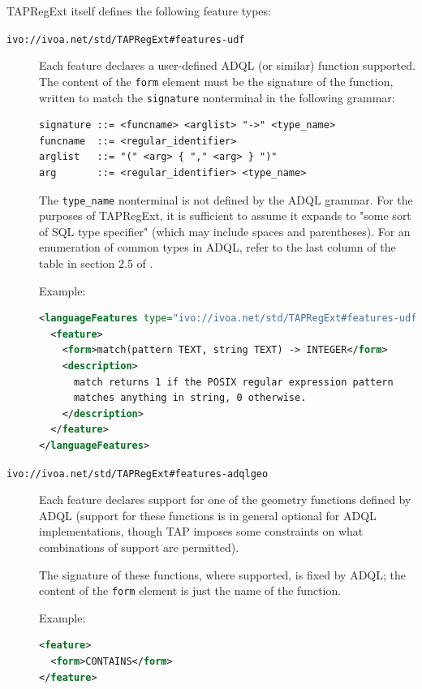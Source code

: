 \documentclass{ivoa}
\begin{document}
TAPRegExt itself defines the following feature types:


\begin{description}
\item[\nolinkurl{ivo://ivoa.net/std/TAPRegExt\#features-udf}] Each feature declares a user-defined ADQL (or similar) function supported.
    The content of the \texttt{form} element
    must be the signature of the function, written to match the
    \texttt{signature} nonterminal in the following grammar:


\begin{verbatim}
signature ::= <funcname> <arglist> "->" <type_name>
funcname  ::= <regular_identifier>
arglist   ::= "(" <arg> { "," <arg> } ")"
arg       ::= <regular_identifier> <type_name>
\end{verbatim}

The \texttt{type\_name} nonterminal is not defined by the ADQL
		grammar. For the purposes of TAPRegExt, it is sufficient to assume
		it expands to "some sort of SQL type specifier" (which may
		include spaces and parentheses).  For an enumeration of common types
		in ADQL, refer to the last column of the table in section 2.5 of 
		\citep{std:TAP}.

Example:


\begin{lstlisting}[language=XML]
<languageFeatures type="ivo://ivoa.net/std/TAPRegExt#features-udf">
  <feature>
    <form>match(pattern TEXT, string TEXT) -> INTEGER</form>
    <description>
      match returns 1 if the POSIX regular expression pattern 
      matches anything in string, 0 otherwise.
    </description>
  </feature>
</languageFeatures>
\end{lstlisting}


\item[\nolinkurl{ivo://ivoa.net/std/TAPRegExt\#features-adqlgeo}] Each feature declares support for one of the geometry functions 
		defined by ADQL
    (support for these functions is in general optional for ADQL
    implementations, though TAP imposes some constraints on what 
    combinations of support are permitted).

The signature of these functions, where supported, is fixed by ADQL;
    the content of the \texttt{form} element
    is just the name of the function.

Example:


\begin{lstlisting}[language=XML]
<feature>
  <form>CONTAINS</form>
</feature>
\end{lstlisting}



\end{description}
\end{document}

